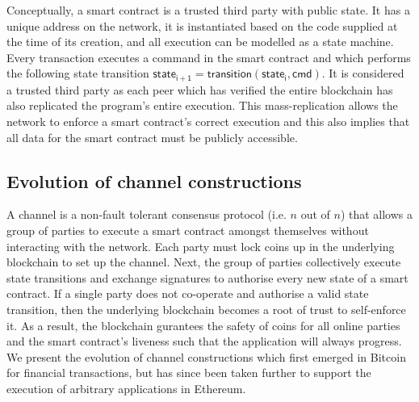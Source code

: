 \documentclass{llncs}
\newcommand{\stateinfoi}{\mathsf{state}_{\mathsf{i}}}
\newcommand{\stateinfoplus}{\mathsf{state}_{\mathsf{i+1}}}
\begin{document}
Conceptually, a smart contract is a trusted third party with public state. 
It has a unique address on the network, it is instantiated based on the code supplied at the time of its creation, and all execution can be modelled as a state machine. 
Every transaction executes a command in the smart contract and which performs the following state transition $\stateinfoplus = \mathsf{transition}(\stateinfoi, \mathsf{cmd})$. 
It is considered a trusted third party as each peer which has verified the entire  blockchain has also replicated the program's entire execution. 
This mass-replication allows the network to enforce a smart contract's correct execution and this also implies that all data for the smart contract must be publicly accessible. 

\subsection{Evolution of channel constructions}

A channel is a non-fault tolerant consensus protocol (i.e. $n$ out of $n$) that allows a group of parties to execute a smart contract amongst themselves without interacting with the network. 
Each party must lock coins up in the underlying blockchain to set up the channel.
Next, the group of parties collectively execute state transitions and exchange signatures to authorise every new state of a smart contract. 
If a single party does not co-operate and authorise a valid state transition, then the underlying blockchain becomes a root of trust to self-enforce it. 
As a result, the blockchain gurantees the safety of coins for all online parties and the smart contract's liveness such that the application will always progress. 
We present the evolution of channel constructions which first emerged in Bitcoin for financial transactions, but has since been taken further to support the execution of arbitrary applications in Ethereum.
\end{document}
